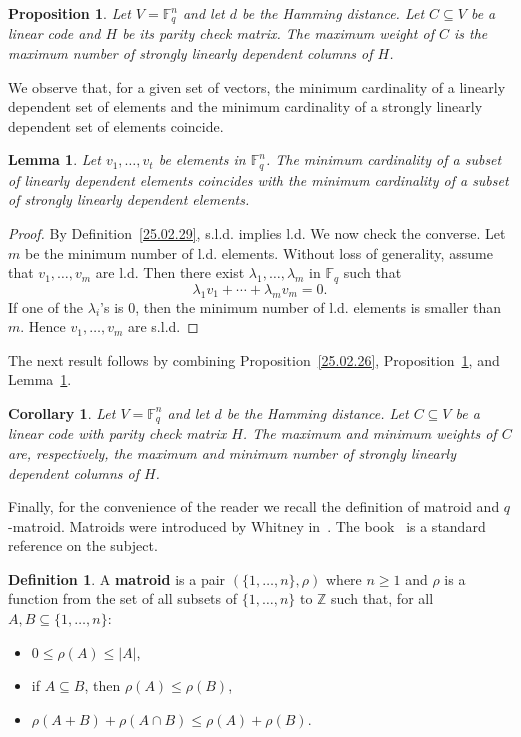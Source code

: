 \documentclass[12pt]{amsart}
\numberwithin{equation}{section}
\newtheorem{proposition}[theorem]{Proposition}
\newtheorem{lemma}[theorem]{Lemma}
\newtheorem{corollary}[theorem]{Corollary}
\theoremstyle{definition}
\newtheorem{definition}[theorem]{Definition}
\newcommand{\FF}{\mathbb{F}}
\begin{document}
\begin{proposition}\label{25.02.27}
Let $V=\FF_q^n$ and let $d$ be the Hamming distance. Let $C \subseteq V$ be a linear code and $H$ be its parity check matrix. The maximum weight of $C$ is the maximum number of strongly linearly dependent columns of $H$.
\end{proposition}

We observe that, for a given set of vectors, the minimum cardinality of a linearly dependent set of elements and the minimum cardinality of a strongly linearly dependent set of elements coincide.

\begin{lemma}\label{25.02.28}
Let $v_1,\ldots,v_t$ be elements in $\FF_q^n$. The minimum cardinality of a subset of linearly dependent elements coincides with the minimum cardinality of a subset of strongly linearly dependent elements.
\end{lemma}

\begin{proof}
By Definition~\ref{25.02.29}, s.l.d. implies l.d. We now check the converse. Let $m$ be the minimum number of l.d. elements. Without loss of generality, assume that $v_1,\ldots,v_m$ are l.d. Then there exist $\lambda_1,\ldots,\lambda_m$ in $\FF_q$ such that
\[\lambda_1v_1 + \cdots + \lambda_mv_m = 0.\]
If one of the $\lambda_i$'s is $0$, then the minimum number of l.d. elements is smaller than $m$. Hence $v_1,\ldots,v_m$ are s.l.d.
\end{proof}

The next result follows by combining Proposition~\ref{25.02.26}, Proposition~\ref{25.02.27}, and Lemma~\ref{25.02.28}.

\begin{corollary}\label{25.03.01}
Let $V=\FF_q^n$ and let $d$ be the Hamming distance. Let $C \subseteq V$ be a linear code with parity check matrix $H$. The maximum and minimum weights of $C$ are, respectively, the maximum and minimum number of strongly linearly dependent columns of $H$.
\end{corollary}

Finally, for the convenience of the reader we recall the definition of matroid and $q$-matroid. Matroids were introduced by Whitney in~\cite{W35}. The book~\cite{O11} is a standard reference on the subject.

\begin{definition}
A \textbf{matroid} is a pair $(\{1,\ldots,n\},\rho)$ where $n \ge 1$ and $\rho$ is a function from the set of all subsets of $\{1,\ldots,n\}$ to $\mathbb{Z}$ such that, for all $A,B\subseteq \{1,\ldots,n\}$:
\begin{itemize} \setlength\itemsep{0em}
\item[(P1)] $0\leq \rho(A)\leq |A|$,
\item[(P2)] if $A\subseteq B$, then $\rho(A)\leq \rho(B)$,
\item[(P3)] $\rho(A+B)+\rho(A\cap B)\leq \rho(A)+\rho(B)$.
\end{itemize}
\end{definition}
\end{document}
